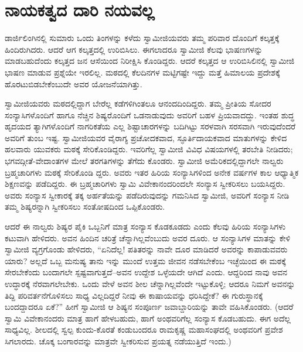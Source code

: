 
\chapter{ನಾಯಕತ್ವದ ದಾರಿ ನಯವಲ್ಲ}

\noindent

ಡಾರ್ಜಿಲಿಂಗಿನಲ್ಲಿ ಸುಮಾರು ಒಂದು ತಿಂಗಳನ್ನು ಕಳೆದು ಸ್ವಾಮೀಜಿಯವರು ತಮ್ಮ ಪರಿವಾರ ದೊಂದಿಗೆ ಕಲ್ಕತ್ತಕ್ಕೆ ಹಿಂದಿರುಗಿದರು. ಆದರೆ ಆಗ ಕಲ್ಕತ್ತದಲ್ಲಿ ಉರಿಬಿಸಿಲು. ಈಗಲಾದರೂ ಸ್ವಾಮೀಜಿ ಕೆಲವು ಭಾಷಣಗಳನ್ನು ಮಾಡಬಹುದೆಂದು ಕಲ್ಕತ್ತದ ಜನ ಆಸೆಯಿಂದ ನಿರೀಕ್ಷಿಸಿ ಕೊಂಡಿದ್ದರು. ಆದರೆ ಕಲ್ಕತ್ತದ ಆ ಉರಿಬಿಸಿಲಿನಲ್ಲಿ ಸ್ವಾಮೀಜಿ ಭಾಷಣ ಮಾಡುವ ಪ್ರಶ್ನೆಯೇ ಇರಲಿಲ್ಲ. ಮಠದಲ್ಲಿ ಕೆಲದಿನಗಳ ಮಟ್ಟಿಗಷ್ಟೇ ಇದ್ದು ಮತ್ತೆ ಹಿಮಾಲಯ ಪ್ರದೇಶಕ್ಕೆ ಹೊರಟುಬಿಡಬೇಕೆಂಬುದೇ ಅವರ ಯೋಜನೆಯಾಗಿತ್ತು.

ಸ್ವಾಮೀಜಿಯವರು ಮಠದಲ್ಲಿದ್ದಾಗ ಬೇರೆಲ್ಲ ಕಡೆಗಳಿಗಿಂತಲೂ ಆನಂದದಿಂದಿದ್ದರು. ತಮ್ಮ ಪ್ರೀತಿಯ ಸೋದರ ಸಂನ್ಯಾಸಿಗಳೊಂದಿಗೆ ಹಾಗೂ ನೆಚ್ಚಿನ ಶಿಷ್ಯರೊಂದಿಗೆ ಒಡನಾಡುವುದು ಅವರಿಗೆ ಬಹಳ ಪ್ರಿಯವಾದದ್ದು. ಇಂತಹ ಶುದ್ಧ ಹೃದಯದ ತ್ಯಾಗಿಗಳೊಂದಿಗೆ ನಾಗರಿಕತೆಯ ಎಲ್ಲ ಶಿಷ್ಟಾಚಾರಗಳನ್ನು ಬದಿಗಿಟ್ಟು ಸರಳವಾಗಿ ಸರಸವಾಗಿ ಇರುವುದೆಂದರೆ ಅವರಿಗೆ ತುಂಬ ಇಷ್ಟ. ಸ್ವಾಮೀಜಿಯವರ ವೈರಾಗ್ಯ ಪ್ರಚೋದಕವಾದ, ಸ್ಫೂರ್ತಿದಾಯಕವಾದ ಮಾತುಗಳನ್ನು ಕೇಳಿದ ಹಲವಾರು ಯುವಕರು ಮಠಕ್ಕೆ ಸೇರಿಕೊಂಡಿದ್ದರು. ಇವರಿಗೆಲ್ಲ ಸ್ವಾಮೀಜಿ ವಿವಿಧ ವಿಷಯಗಳಲ್ಲಿ ತರಬೇತಿ ನೀಡಿದರು; ಭಗವದ್ಗೀತೆ-ವೇದಾಂತಗಳ ಮೇಲೆ ತರಗತಿಗಳನ್ನು ತೆಗೆದು ಕೊಂಡರು. ಸ್ವಾಮೀಜಿ ಅಮೆರಿಕದಲ್ಲಿದ್ದಾಗಲೇ ನಾಲ್ವರು ಬ್ರಹ್ಮಚಾರಿಗಳು ಮಠಕ್ಕೆ ಸೇರಿಕೊಂಡಿ ದ್ದರು. ಅವರು ಇತರ ಹಿರಿಯ ಸಂನ್ಯಾಸಿಗಳಿಂದ ಅನೇಕ ವರ್ಷಗಳ ಕಾಲ ಆಧ್ಯಾತ್ಮಿಕ ಶಿಕ್ಷಣವನ್ನು ಪಡೆದಿದ್ದರು. ಈ ಬ್ರಹ್ಮಚಾರಿಗಳು ಸ್ವಾಮಿ ವಿವೇಕಾನಂದರಿಂದಲೇ ಸಂನ್ಯಾಸ ಸ್ವೀಕರಿಸಲು ಬಯಸಿದ್ದರು. ಅವರು ಸಂನ್ಯಾಸ ಸ್ವೀಕಾರಕ್ಕೆ ತಕ್ಕ ಅರ್ಹತೆಯನ್ನು ಪಡೆದಿರುವುದನ್ನು ಗಮನಿಸಿದ ಸ್ವಾಮೀಜಿ, ಅವರಿಗೆ ಸಂನ್ಯಾಸ ನೀಡಿ ತಮ್ಮ ಶಿಷ್ಯರನ್ನಾಗಿ ಸ್ವೀಕರಿಸಲು ಸಂತೋಷದಿಂದ ಒಪ್ಪಿಕೊಂಡರು.

ಆದರೆ ಈ ನಾಲ್ವರು ಶಿಷ್ಯರ ಪೈಕಿ ಒಬ್ಬನಿಗೆ ಮಾತ್ರ ಸಂನ್ಯಾಸ ಕೊಡಕೂಡದು ಎಂದು ಕೆಲವು ಹಿರಿಯ ಸಂನ್ಯಾಸಿಗಳು ಕಟುವಾಗಿ ಹೇಳಿದರು. ಅವನ ಹಿಂದಿನ ಚರಿತ್ರೆ ಚೆನ್ನಾಗಿಲ್ಲವೆಂಬುದು ಅವರ ದೂರು. ಆ ಸಂನ್ಯಾಸಿಗಳ ಮಾತನ್ನು ಕೇಳಿ ಸ್ವಾಮೀಜಿ ವ್ಯಗ್ರಗೊಂಡು ಹೇಳಿದರು, “ಏನಿದೆಲ್ಲ! ಪತಿತರನ್ನು ನಾವೇ ದೂರ ಮಾಡಿದರೆ ಅವರನ್ನು ಕಾಪಾಡುವವರು ಯಾರು? ಅಲ್ಲದೆ ಒಬ್ಬ ಮನುಷ್ಯ ತಾನು ಇನ್ನು ಮುಂದೆ ಉತ್ತಮ ಜೀವನ ನಡೆಸಬೇಕೆಂಬ ಇಚ್ಛೆಯಿಂದ ಈ ಮಠಕ್ಕೆ ಸೇರಬೇಕೆಂದು ಬಂದಾಗಲೇ ಸ್ಪಷ್ಟವಾಗುತ್ತದೆ–ಅವನ ಉದ್ದೇಶ ಒಳ್ಳೆಯದೇ ಆಗಿದೆ ಎಂದು. ಆದ್ದರಿಂದ ನಾವು ಅವನ ಉದ್ಧಾರಕ್ಕೆ ನೆರವಾಗಲೇಬೇಕು. ಒಂದು ವೇಳೆ ಅವನ ಶೀಲ ಚೆನ್ನಾಗಿಲ್ಲವೆಂದೇ ಇಟ್ಟುಕೊಳ್ಳಿ; ಆದರೂ ನಿಮಗೆ ಅವನನ್ನು ತಿದ್ದಿ ಪರಿವರ್ತನೆಗೊಳಿಸಲು ಸಾಧ್ಯ ವಿಲ್ಲದಿದ್ದರೆ ನೀವು ಈ ಕಾಷಾಯವನ್ನು ಧರಿಸಿದ್ದೇಕೆ? ಈ ಗುರುಸ್ಥಾನಕ್ಕೆ ಬಂದದ್ದಾದರೂ ಏಕೆ?” ಹೀಗೆ ಸ್ವಾಮೀಜಿ ಆ ಶಿಷ್ಯನ ಸಂಪೂರ್ಣ ಜವಾಬ್ದಾರಿಯನ್ನು ತಾವೇ ವಹಿಸಿಕೊಂಡರು. (ಆದರೆ ಸ್ವಾಮಿ ವಿವೇಕಾನಂದರು ಮಾತ್ರ ಹಾಗೆ ಹೇಳಬಹುದು, ಹಾಗೆ ಅಂಥವರಿಗೆಲ್ಲ ಸಂನ್ಯಾಸ ಕೊಡಬಹುದು. ಈಗ ಅದೆಲ್ಲ ಸಾಧ್ಯವಿಲ್ಲ. ಶೀಲದಲ್ಲಿ ಸ್ವಲ್ಪ ಕುಂದು-ಕೊರತೆ ಕಂಡುಬಂದರೂ ರಾಮಕೃಷ್ಣ ಮಹಾಸಂಘದಲ್ಲಿ ಅಂಥವರಿಗೆ ಪ್ರವೇಶ ಸಿಗಲಾರದು. ಚೊಕ್ಕ ಬಂಗಾರವನ್ನು ಮಾತ್ರವೇ ಸ್ವೀಕರಿಸುವ ಪ್ರಯತ್ನ ನಡೆಯುತ್ತಿದೆ ಇಂದು.)

